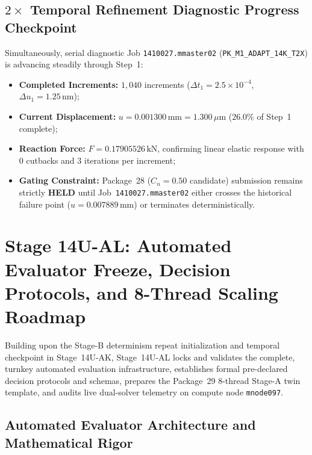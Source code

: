 \subsection{\texorpdfstring{$2\times$}{2x} Temporal Refinement Diagnostic Progress Checkpoint}
\label{subsec:stage14uak_temporal_progress}

Simultaneously, serial diagnostic Job \texttt{1410027.mmaster02} (\texttt{PK\_M1\_ADAPT\_14K\_T2X}) is advancing steadily through Step~1:
\begin{itemize}
  \item \textbf{Completed Increments:} $1{,}040$ increments ($\Delta t_1 = 2.5\times 10^{-4}$, $\Delta u_1 = 1.25\,\mathrm{nm}$);
  \item \textbf{Current Displacement:} $u = 0.001300\,\mathrm{mm} = 1.300\,\mu\mathrm{m}$ ($26.0\%$ of Step~1 complete);
  \item \textbf{Reaction Force:} $F = 0.17905526\,\mathrm{kN}$, confirming linear elastic response with $0$ cutbacks and $3$ iterations per increment;
  \item \textbf{Gating Constraint:} Package~28 ($C_n = 0.50$ candidate) submission remains strictly \textbf{HELD} until Job~\texttt{1410027.mmaster02} either crosses the historical failure point ($u = 0.007889\,\mathrm{mm}$) or terminates deterministically.
\end{itemize}

\section{Stage 14U-AL: Automated Evaluator Freeze, Decision Protocols, and 8-Thread Scaling Roadmap}
\label{sec:stage14ual_evaluators_and_decision_protocols}

Building upon the Stage-B determinism repeat initialization and temporal checkpoint in Stage~14U-AK, Stage~14U-AL locks and validates the complete, turnkey automated evaluation infrastructure, establishes formal pre-declared decision protocols and schemas, prepares the Package~29 8-thread Stage-A twin template, and audits live dual-solver telemetry on compute node \texttt{mnode097}.

\subsection{Automated Evaluator Architecture and Mathematical Rigor}
\label{subsec:stage14ual_evaluator_architecture}

